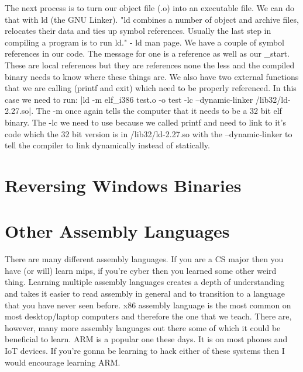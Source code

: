 \documentclass{report}
\begin{document}
The next process is to turn our object file (.o) into an executable file.  We can do that with ld (the GNU Linker).  "ld combines a number of object and archive files, relocates their data and ties up symbol references.  Usually the last step in compiling a program is to run ld." - ld man page.  We have a couple of symbol references in our code.  The message for one is a reference as well as our \_start.  These are local references but they are references none the less and the compiled binary needs to know where these things are.  We also have two external functions that we are calling (printf and exit) which need to be properly referenced.  In this case we need to run: |ld -m elf_i386 test.o -o test -lc --dynamic-linker /lib32/ld-2.27.so|.  The -m once again tells the computer that it needs to be a 32 bit elf binary.  The -lc we need to use because we called printf and need to link to it's code which the 32 bit version is in /lib32/ld-2.27.so with the --dynamic-linker to tell the compiler to link dynamically instead of statically.


\chapter{Reversing Windows Binaries}

\chapter{Other Assembly Languages}
There are many different assembly languages.  If you are a CS major then you have (or will) learn mips, if you're cyber then you learned some other weird thing.  Learning multiple assembly languages creates a depth of understanding and takes it easier to read assembly in general and to transition to a language that you have never seen before.  x86 assembly language is the most common on most desktop/laptop computers and therefore the one that we teach.  There are, however, many more assembly languages out there some of which it could be beneficial to learn. ARM is a popular one these days.  It is on most phones and IoT devices.  If you're gonna be learning to hack either of these systems then I would encourage learning ARM.  
\end{document}
